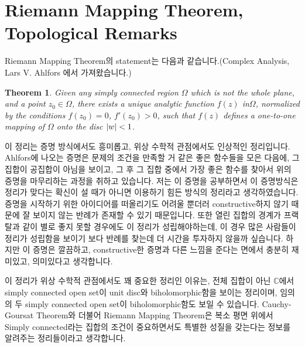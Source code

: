 \documentclass{article}
\newtheorem{theorem}{Theorem}
\begin{document}
\section{Riemann Mapping Theorem, Topological Remarks}
Riemann Mapping Theorem의 statement는 다음과 같습니다.(Complex Analysis, Lars V. Ahlfors 에서 가져왔습니다.)
\begin{theorem}
Given any simply connected region $\Omega$ which is not the whole plane, and a point $z_0\in \Omega$, there exists a unique analytic function $f(z)$ in$ \Omega$, normalized by the conditions $f(z_0)=0$, $f'(z_0)>0$, such that $f(z)$ defines a one-to-one mapping of $\Omega$ onto the disc $\abs{w}<1$.
\end{theorem}
이 정리는 증명 방식에서도 흥미롭고, 위상 수학적 관점에서도 인상적인 정리입니다. Ahlfors에 나오는 증명은 문제의 조건을 만족할 거 같은 좋은 함수들을 모은 다음에, 그 집합이 공집합이 아님을 보이고, 그 후 그 집합 중에서 가장 좋은 함수를 찾아서 위의 증명을 마무리하는 과정을 취하고 있습니다. 저는 이 증명을 공부하면서 이 증명방식은 정리가 맞다는 확신이 설 때가 아니면 이용하기 힘든 방식의 정리라고 생각하였습니다. 증명을 시작하기 위한 아이디어를 떠올리기도 어려울 뿐더러 constructive하지 않기 때문에 잘 보이지 않는 반례가 존재할 수 있기 때문입니다. 또한 열린 집합의 경계가 프랙탈과 같이 별로 좋지 못할 경우에도 이 정리가 성립해야하는데, 이 경우 많은 사람들이 정리가 성립함을 보이기 보다 반례를 찾는데 더 시간을 투자하지 않을까 싶습니다. 하지만 이 증명은 깔끔하고, constructive한 증명과 다른 느낌을 준다는 면에서 충분히 재미있고, 의미있다고 생각합니다.

이 정리가 위상 수학적 관점에서도 꽤 중요한 정리인 이유는, 전체 집합이 아닌 $\mathbb{C}$에서 simply connected open set이 unit disc와 biholomorphic함을 보이는 정리이며, 임의의 두 simply connected open set이 biholomorphic함도 보일 수 있습니다. Cauchy-Goursat Theorem와 더불어 Riemann Mapping Theorem은 복소 평면 위에서 Simply connected라는 집합의 조건이 중요하면서도 특별한 성질을 갖는다는 정보를 알려주는 정리들이라고 생각합니다.
\end{document}
